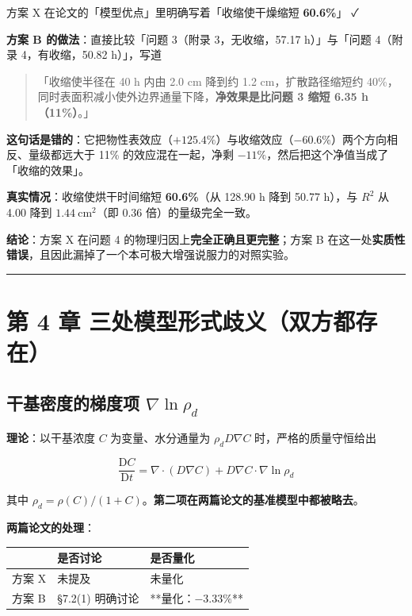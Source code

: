 方案 X 在论文的「模型优点」里明确写着「收缩使干燥缩短 \textbf{60.6\%}」 ✓


\textbf{方案 B 的做法}：直接比较「问题 3（附录 3，无收缩，57.17 h）」与「问题 4（附录 4，有收缩，50.82 h）」，写道


\begin{quote}
「收缩使半径在 40 h 内由 2.0 cm 降到约 1.2 cm，扩散路径缩短约 40\%，同时表面积减小使外边界通量下降，\textbf{净效果是比问题 3 缩短 6.35 h（11\%）}。」
\end{quote}


\textbf{这句话是错的}：它把物性表效应（$+125.4\%$）与收缩效应（$-60.6\%$）两个方向相反、量级都远大于 11\% 的效应混在一起，净剩 $-11\%$，然后把这个净值当成了「收缩的效果」。


\textbf{真实情况}：收缩使烘干时间缩短 \textbf{60.6\%}（从 128.90 h 降到 50.77 h），与 $R^2$ 从 4.00 降到 $1.44\ \mathrm{cm^2}$（即 0.36 倍）的量级完全一致。


\textbf{结论}：方案 X 在问题 4 的物理归因上\textbf{完全正确且更完整}；方案 B 在这一处\textbf{实质性错误}，且因此漏掉了一个本可极大增强说服力的对照实验。


\vspace{1mm}\hrule\vspace{1mm}


\section{第 4 章 三处模型形式歧义（双方都存在）}


\subsection{干基密度的梯度项 $\nabla\ln\rho_d$}


\textbf{理论}：以干基浓度 $C$ 为变量、水分通量为 $\rho_dD\nabla C$ 时，严格的质量守恒给出


\begin{equation*}
\frac{\mathrm DC}{\mathrm Dt}=\nabla\!\cdot\!(D\nabla C)+D\nabla C\!\cdot\!\nabla\ln\rho_d
\end{equation*}


其中 $\rho_d=\rho(C)/(1+C)$。\textbf{第二项在两篇论文的基准模型中都被略去}。


\textbf{两篇论文的处理}：


\begin{center}
\small
\begin{tabular}{lll}
\toprule
 & 是否讨论 & 是否量化 \\
\midrule
方案 X & 未提及 & 未量化 \\
方案 B & §7.2(1) 明确讨论 & **量化：$-3.33\%$** \\
\bottomrule
\end{tabular}
\end{center}


